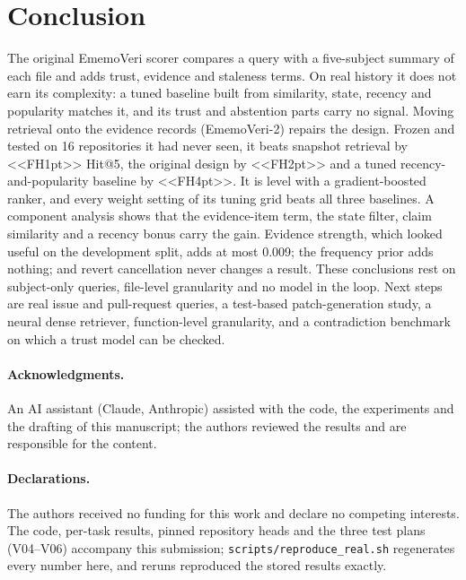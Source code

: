 \documentclass[conference]{IEEEtran}
\newcommand{\sys}{EmemoVeri}
\begin{document}
\section{Conclusion}
The original \sys{} scorer compares a query with a five-subject summary of each file and adds trust, evidence and staleness terms. On real history it does not earn its complexity: a tuned baseline built from similarity, state, recency and popularity matches it, and its trust and abstention parts carry no signal. Moving retrieval onto the evidence records (\sys{}-2) repairs the design. Frozen and tested on 16 repositories it had never seen, it beats snapshot retrieval by <<FH1pt>> Hit@5, the original design by <<FH2pt>> and a tuned recency-and-popularity baseline by <<FH4pt>>. It is level with a gradient-boosted ranker, and every weight setting of its tuning grid beats all three baselines. A component analysis shows that the evidence-item term, the state filter, claim similarity and a recency bonus carry the gain. Evidence strength, which looked useful on the development split, adds at most 0.009; the frequency prior adds nothing; and revert cancellation never changes a result. These conclusions rest on subject-only queries, file-level granularity and no model in the loop. Next steps are real issue and pull-request queries, a test-based patch-generation study, a neural dense retriever, function-level granularity, and a contradiction benchmark on which a trust model can be checked.

\paragraph{Acknowledgments.} An AI assistant (Claude, Anthropic) assisted with the code, the experiments and the drafting of this manuscript; the authors reviewed the results and are responsible for the content.

\paragraph{Declarations.} The authors received no funding for this work and declare no competing interests. The code, per-task results, pinned repository heads and the three test plans (V04--V06) accompany this submission; \texttt{scripts/reproduce\_real.sh} regenerates every number here, and reruns reproduced the stored results exactly.



\end{document}
